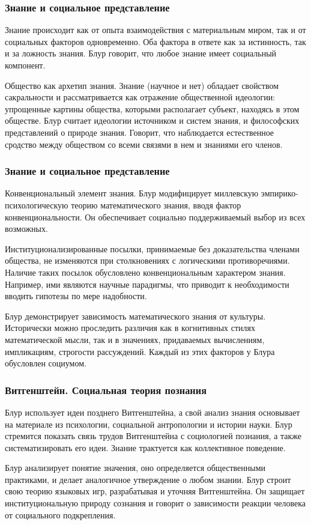 \documentclass[10pt]{beamer}
\begin{document}
\begin{frame}[label=book1-3]%
  \frametitle{Знание и социальное представление}

  Знание происходит как от опыта взаимодействия с материальным миром, 
  так и от социальных факторов одновременно. Оба фактора в ответе как за 
  истинность, так и за ложность знания. Блур говорит, что любое знание 
  имеет социальный компонент.

  \vfill
  Общество как архетип знания.
  Знание (научное и нет) обладает свойством сакральности 
  и рассматривается как отражение общественной идеологии: упрощенные 
  картины общества, которыми располагает субъект, находясь в этом 
  обществе. Блур считает идеологии источником и систем знания, 
  и философских представлений о природе знания. Говорит, что наблюдается 
  естественное сродство между обществом со всеми связями в нем 
  и знаниями его членов.
\end{frame}%

\begin{frame}[label=book1-4]%
  \frametitle{Знание и социальное представление}

  Конвенциональный элемент знания. Блур модифицирует миллевскую 
  эмпирико-психологическую теорию математического знания, вводя фактор 
  конвенциональности. Он обеспечивает социально поддерживаемый выбор из 
  всех возможных.

  \vfill
  Институционализированные посылки, принимаемые без доказательства 
  членами общества, не изменяются при столкновениях с логическими 
  противоречиями. Наличие таких посылок обусловлено конвенциональным 
  характером знания. Например, ими являются научные парадигмы, что 
  приводит к необходимости вводить гипотезы по мере надобности.

  \vfill
  Блур демонстрирует зависимость математического знания от культуры. 
  Исторически можно проследить различия как в когнитивных стилях 
  математической мысли, так и в значениях, придаваемых вычислениям, 
  импликациям, строгости рассуждений. Каждый из этих факторов у Блура 
  обусловлен социумом.
\end{frame}%

\begin{frame}[label=book2-1]%
  \frametitle{Витгенштейн. Социальная теория познания}

  Блур использует идеи позднего Витгенштейна, а свой анализ знания 
  основывает на материале из психологии, социальной антропологии 
  и истории науки. Блур стремится показать связь трудов Витгенштейна 
  с социологией познания, а также систематизировать его идеи. Знание 
  трактуется как коллективное поведение.

  \vfill
  Блур анализирует понятие значения, оно определяется общественными 
  практиками, и делает аналогичное утверждение о любом знании. Блур 
  строит свою теорию языковых игр, разрабатывая и уточняя Витгенштейна. 
  Он защищает институциональную природу сознания и говорит о зависимости 
  реакции человека от социального подкрепления.
\end{frame}%
\end{document}
